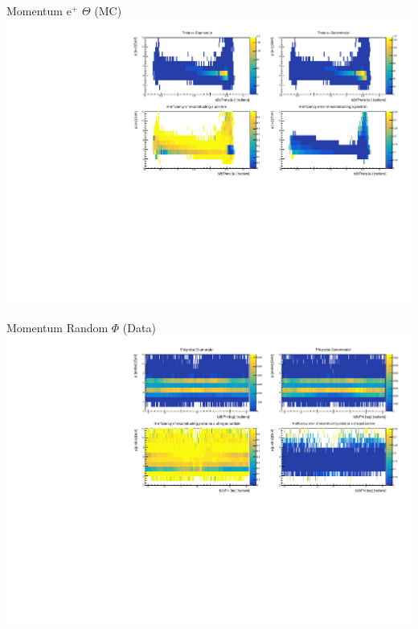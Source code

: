 \documentclass[10pt]{beamer}
\begin{document}
\begin{frame}{Momentum $\textrm{e}^+$ $\Theta$ (MC)}
	\centering
	\includegraphics[width=\textwidth]{Momentum/MThetaep_MC}
\end{frame}









\begin{frame}{Momentum Random $\Phi$ (Data)}
	\centering
	\includegraphics[width=\textwidth]{Momentum/MPhiRandom_Data}
\end{frame}
\end{document}
